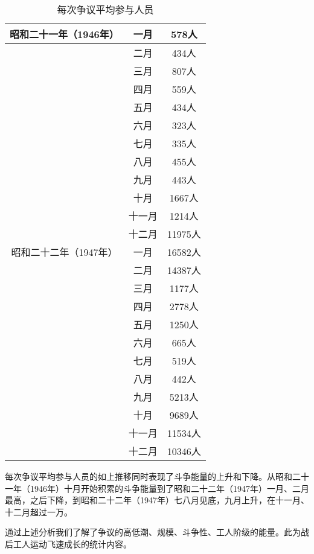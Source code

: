 \documentclass[a4paper,12pt]{article}
\begin{document}
\begin{table}
  \begin{tabular}{|c|c|c|}
    \hline
    昭和二十一年（1946年） & 一月 & 578人 \\ 
    \hline
                         & 二月 & 434人 \\ 
    \hline
                         & 三月 & 807人 \\ 
    \hline
                         & 四月 & 559人 \\ 
    \hline
                         & 五月 & 434人 \\ 
    \hline
                         & 六月 & 323人 \\ 
    \hline
                         & 七月 & 335人 \\ 
    \hline
                         & 八月 & 455人 \\ 
    \hline
                         & 九月 & 443人 \\ 
    \hline
                         & 十月 & 1667人 \\ 
    \hline
                         & 十一月 & 1214人 \\ 
    \hline
                         & 十二月 & 11975人 \\ 
    \hline
    昭和二十二年（1947年） & 一月 & 16582人 \\ 
    \hline
                         & 二月 & 14387人 \\ 
    \hline
                         & 三月 & 1177人 \\ 
    \hline
                         & 四月 & 2778人 \\ 
    \hline
                         & 五月 & 1250人 \\ 
    \hline
                         & 六月 & 665人 \\ 
    \hline
                         & 七月 & 519人 \\ 
    \hline
                         & 八月 & 442人 \\ 
    \hline
                         & 九月 & 5213人 \\ 
    \hline
                         & 十月 & 9689人 \\ 
    \hline
                         & 十一月 & 11534人 \\ 
    \hline
                         & 十二月 & 10346人 \\ 
    \hline
  \end{tabular}
  \caption{每次争议平均参与人员}
\end{table}
每次争议平均参与人员的如上推移同时表现了斗争能量的上升和下降。从昭和二十一年（1946年）十月开始积累的斗争能量到了昭和二十二年（1947年）一月、二月最高，之后下降，到昭和二十二年（1947年）七八月见底，九月上升，在十一月、十二月超过一万。

通过上述分析我们了解了争议的高低潮、规模、斗争性、工人阶级的能量。此为战后工人运动飞速成长的统计内容。


  
\end{document}
